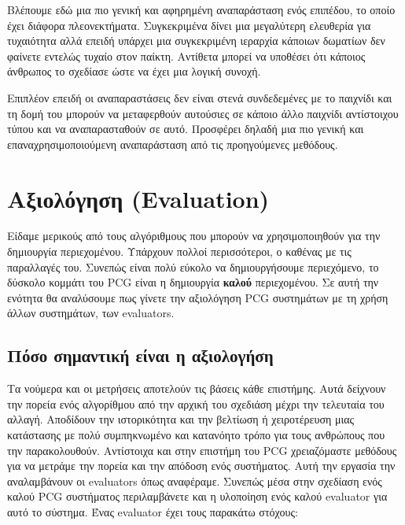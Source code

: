 \par
Βλέπουμε εδώ μια πιο γενική και αφηρημένη αναπαράσταση ενός επιπέδου, το οποίο έχει διάφορα πλεονεκτήματα. Συγκεκριμένα δίνει μια μεγαλύτερη ελευθερία για τυχαιότητα αλλά επειδή υπάρχει μια συγκεκριμένη ιεραρχία κάποιων δωματίων δεν φαίνετε εντελώς τυχαίο στον παίκτη. Αντίθετα μπορεί να υποθέσει ότι κάποιος άνθρωπος το σχεδίασε ώστε να έχει μια λογική συνοχή.
\par
Επιπλέον επειδή οι αναπαραστάσεις δεν είναι στενά συνδεδεμένες με το παιχνίδι και τη δομή του μπορούν να μεταφερθούν αυτούσιες σε κάποιο άλλο παιχνίδι αντίστοιχου τύπου και να αναπαρασταθούν σε αυτό. Προσφέρει δηλαδή μια πιο γενική και επαναχρησιμοποιούμενη αναπαράσταση από τις προηγούμενες μεθόδους.


\section{Αξιολόγηση (Evaluation)}
Είδαμε μερικούς από τους αλγόριθμους που μπορούν να χρησιμοποιηθούν για την δημιουργία περιεχομένου. Υπάρχουν πολλοί περισσότεροι, ο καθένας με τις παραλλαγές του. Συνεπώς είναι πολύ εύκολο να δημιουργήσουμε περιεχόμενο, το δύσκολο κομμάτι του PCG είναι η δημιουργία \textbf{καλού} περιεχομένου. Σε αυτή την ενότητα θα αναλύσουμε πως γίνετε την αξιολόγηση PCG συστημάτων με τη χρήση άλλων συστημάτων, των evaluators.

\subsection{Πόσο σημαντική είναι η αξιολογήση}
Τα νούμερα και οι μετρήσεις αποτελούν τις βάσεις κάθε επιστήμης. Αυτά δείχνουν την πορεία ενός αλγορίθμου από την αρχική του σχεδιάση μέχρι την τελευταία του αλλαγή. Αποδίδουν την ιστορικότητα και την βελτίωση ή χειροτέρευση μιας κατάστασης με πολύ συμπηκνωμένο και κατανόητο τρόπο για τους ανθρώπους που την παρακολουθούν. Αντίστοιχα και στην επιστήμη του PCG χρειαζόμαστε μεθόδους για να μετράμε την πορεία και την απόδοση ενός συστήματος. Αυτή την εργασία την αναλαμβάνουν οι evaluators όπως αναφέραμε. Συνεπώς μέσα στην σχεδίαση ενός καλού PCG συστήματος περιλαμβάνετε και η υλοποίηση ενός καλού evaluator για αυτό το σύστημα. Ένας evaluator έχει τους παρακάτω στόχους:

